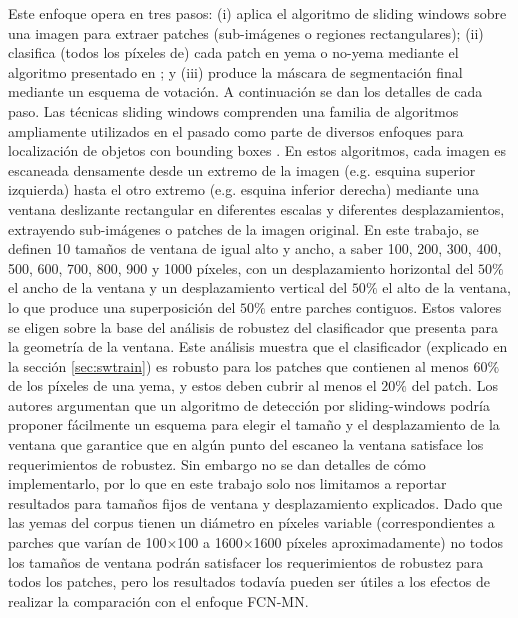\documentclass[a4paper,authoryear,review]{elsarticle}
\begin{document}
Este enfoque opera en tres pasos: (i) aplica el algoritmo de sliding windows sobre una imagen para extraer patches (sub-imágenes o regiones rectangulares); (ii) clasifica (todos los píxeles de) cada patch en yema o no-yema mediante el algoritmo presentado en \citet{perez2017image}; y (iii) produce la máscara de segmentación final mediante un esquema de votación. A continuación se dan los detalles de cada paso.
%
Las técnicas sliding windows comprenden una familia de algoritmos ampliamente utilizados en el pasado como parte de diversos enfoques para localización de objetos con bounding boxes \citep{divvala2009empirical, wang2009hog, chum2007exemplar, ferrari2007groups, dalal2005histograms, rowley1996human}. En estos algoritmos, cada imagen es escaneada densamente desde un extremo de la imagen (e.g. esquina superior izquierda) hasta el otro extremo (e.g. esquina inferior derecha) mediante una ventana deslizante rectangular en diferentes escalas y diferentes desplazamientos, extrayendo sub-imágenes o patches de la imagen original. En este trabajo, se definen 10 tamaños de ventana de igual alto y ancho, a saber 100, 200, 300, 400, 500, 600, 700, 800, 900 y 1000 píxeles, con un desplazamiento horizontal del $50\%$ el ancho de la ventana y un desplazamiento vertical del $50\%$ el alto de la ventana, lo que produce una superposición del $50\%$ entre parches contiguos. Estos valores se eligen sobre la base del análisis de robustez del clasificador que presenta \citet{perez2017image} para la geometría de la ventana. Este análisis muestra que el clasificador (explicado en la sección \ref{sec:swtrain}) es robusto para los patches que contienen al menos $60\%$ de los píxeles de una yema, y estos deben cubrir al menos el $20\%$ del patch. Los autores argumentan que un algoritmo de detección por sliding-windows podría proponer fácilmente un esquema para elegir el tamaño y el desplazamiento de la ventana que garantice que en algún punto del escaneo la ventana satisface los requerimientos de robustez. Sin embargo no se dan detalles de cómo implementarlo, por lo que en este trabajo solo nos limitamos a reportar resultados para tamaños fijos de ventana y desplazamiento explicados. Dado que las yemas del corpus tienen un diámetro en píxeles variable (correspondientes a parches que varían de 100×100 a 1600×1600 píxeles aproximadamente) no todos los tamaños de ventana podrán satisfacer los requerimientos de robustez para todos los patches, pero los resultados todavía pueden ser útiles a los efectos de realizar la comparación con el enfoque FCN-MN.
%
\end{document}
